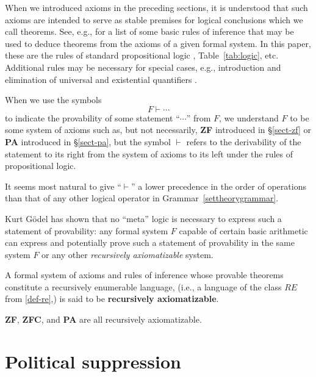 \documentclass[letterpaper]{article}
\newcommand{\Definition}{\raisebox{-0.25ex}{\large\dsliterary}}
\begin{document}
When we introduced axioms in the preceding sections, it is understood that such axioms are intended to serve as stable premises for logical conclusions which we call theorems. See, e.g., \cite{moura2010} for a list of some basic rules of inference that may be used to deduce theorems from the axioms of a given formal system.  In this paper, these are the rules of standard propositional logic \cite{klement0000}, Table~\ref{tab:logic}, etc.  Additional rules may be necessary for special cases, e.g., introduction and elimination of universal and existential quantifiers \cite{prawitz2006}.

When we use the symbols
\begin{equation}
F\vdash\cdots
\end{equation}
to indicate the provability of some statement ``$\cdots$'' from $F$,
we understand $F$ to be some system of axioms such as, but not necessarily, \textbf{ZF} introduced in \S \ref{sect-zf} or \textbf{PA} introduced in \S \ref{sect-pa}, but the symbol $\vdash$ refers to the derivability of the statement to its right from the system of axioms to its left under the rules of propositional logic.
\begin{remark}
	It seems most natural to give ``$\vdash$'' a lower precedence in the order of operations than that of any other logical operator in Grammar~\ref{settheorygrammar}.
\end{remark}
Kurt G{\"o}del has shown that no ``meta'' logic is necessary to express such a statement of provability:  any formal system $F$ capable of certain basic arithmetic can express and potentially prove such a statement of provability in the same system $F$ or any other \textit{recursively axiomatizable} system.
\begin{definition}A formal system of axioms and rules of inference whose provable theorems constitute a recursively enumerable language, (i.e., a language of the class $RE$ from \Definition \ref{def-re},) is said to be \textbf{recursively axiomatizable}.
\end{definition}
\begin{remark}
\textbf{ZF}, \textbf{ZFC}, and \textbf{PA} are all recursively axiomatizable.
\end{remark}

\section{Political suppression}
\end{document}
